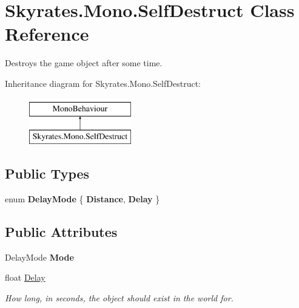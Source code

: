 \hypertarget{class_skyrates_1_1_mono_1_1_self_destruct}{\section{Skyrates.\-Mono.\-Self\-Destruct Class Reference}
\label{class_skyrates_1_1_mono_1_1_self_destruct}
}


Destroys the game object after some time.  


Inheritance diagram for Skyrates.\-Mono.\-Self\-Destruct\-:\begin{figure}[H]
\begin{center}
\leavevmode
\includegraphics[height=2.000000cm]{class_skyrates_1_1_mono_1_1_self_destruct}
\end{center}
\end{figure}
\subsection*{Public Types}
\begin{DoxyCompactItemize}
\item 
enum {\bfseries Delay\-Mode} \{ {\bfseries Distance}, 
{\bfseries Delay}
 \}
\end{DoxyCompactItemize}
\subsection*{Public Attributes}
\begin{DoxyCompactItemize}
\item 
\hypertarget{class_skyrates_1_1_mono_1_1_self_destruct_a166506660b93b6d6a5f289b34dd7cd96}{Delay\-Mode {\bfseries Mode}}\label{class_skyrates_1_1_mono_1_1_self_destruct_a166506660b93b6d6a5f289b34dd7cd96}

\item 
float \hyperlink{class_skyrates_1_1_mono_1_1_self_destruct_a922acaf93a559878b519ec239e050915}{Delay}
\begin{DoxyCompactList}\small\item\em How long, in seconds, the object should exist in the world for. \end{DoxyCompactList}\end{DoxyCompactItemize}


